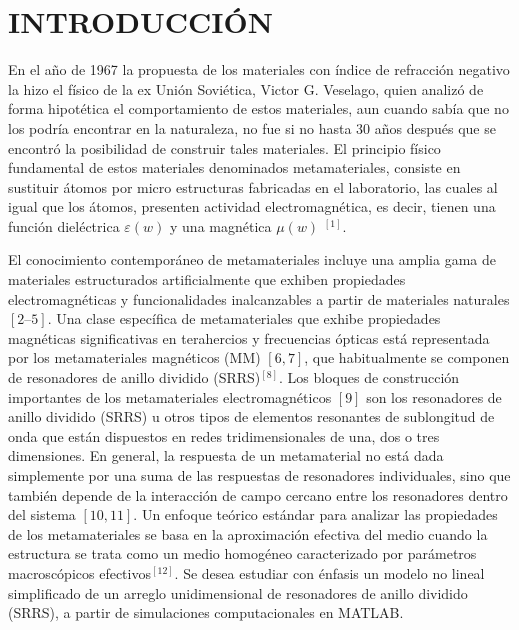 \documentclass[11pt,letterpaper,twocolumn]{article}
\begin{document}
\section*{\normalsize{INTRODUCCIÓN}} 
En el año de 1967 la propuesta de los materiales con índice de refracción negativo la hizo el físico de la ex Unión Soviética, Victor G. Veselago, quien analizó de forma hipotética el comportamiento de estos materiales, aun cuando sabía que no los podría encontrar en la naturaleza, no fue si no hasta 30 años después que se encontró la posibilidad de construir tales materiales. El principio físico fundamental de estos materiales denominados metamateriales, consiste en sustituir átomos por micro estructuras fabricadas en el laboratorio, las cuales al igual que los átomos, presenten actividad electromagnética, es decir, tienen una función dieléctrica $\varepsilon (w)$ y una magnética $\mu (w)$ $^{[1]}$.\\
\par 
El conocimiento contemporáneo de metamateriales incluye una amplia gama de materiales estructurados artificialmente que exhiben propiedades electromagnéticas y funcionalidades inalcanzables a partir de materiales naturales $[2–5]$. Una clase específica de metamateriales que exhibe propiedades magnéticas significativas en terahercios y frecuencias ópticas está representada por los metamateriales magnéticos (MM) $[6,7]$, que habitualmente se componen de resonadores de anillo dividido (SRR\textquotesingle S)$^{[8]}$. Los bloques de construcción importantes de los metamateriales electromagnéticos $[9]$ son los resonadores de anillo dividido (SRR\textquotesingle S) u otros tipos de elementos resonantes de sublongitud de onda que están dispuestos en redes tridimensionales de una, dos o tres dimensiones. En general, la respuesta de un metamaterial no está dada simplemente por una suma de las respuestas de resonadores individuales, sino que también depende de la interacción de campo cercano entre los resonadores dentro del sistema $[10, 11]$. Un enfoque teórico estándar para analizar las propiedades de los metamateriales se basa en la aproximación efectiva del medio cuando la estructura se trata como un medio homogéneo caracterizado por parámetros macroscópicos efectivos$^{[12]}$. Se desea estudiar con énfasis un modelo no lineal simplificado de un arreglo unidimensional de resonadores de anillo dividido (SRR\textquotesingle S), a partir de simulaciones computacionales en MATLAB. 
\end{document}
